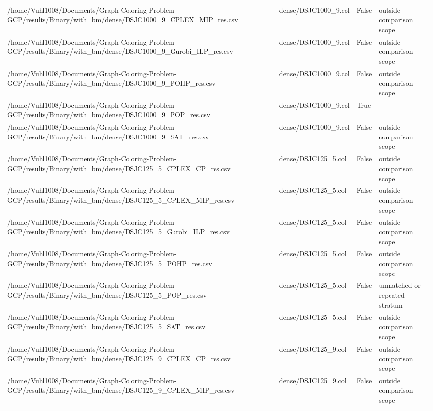\begin{table}[htbp]
\begin{tabular}{llll}
/home/Vuhl1008/Documents/Graph-Coloring-Problem-GCP/results/Binary/with\_bm/dense/DSJC1000\_9\_CPLEX\_MIP\_res.csv & dense/DSJC1000\_9.col & False & outside comparison scope \\
/home/Vuhl1008/Documents/Graph-Coloring-Problem-GCP/results/Binary/with\_bm/dense/DSJC1000\_9\_Gurobi\_ILP\_res.csv & dense/DSJC1000\_9.col & False & outside comparison scope \\
/home/Vuhl1008/Documents/Graph-Coloring-Problem-GCP/results/Binary/with\_bm/dense/DSJC1000\_9\_POHP\_res.csv & dense/DSJC1000\_9.col & False & outside comparison scope \\
/home/Vuhl1008/Documents/Graph-Coloring-Problem-GCP/results/Binary/with\_bm/dense/DSJC1000\_9\_POP\_res.csv & dense/DSJC1000\_9.col & True & -- \\
/home/Vuhl1008/Documents/Graph-Coloring-Problem-GCP/results/Binary/with\_bm/dense/DSJC1000\_9\_SAT\_res.csv & dense/DSJC1000\_9.col & False & outside comparison scope \\
/home/Vuhl1008/Documents/Graph-Coloring-Problem-GCP/results/Binary/with\_bm/dense/DSJC125\_5\_CPLEX\_CP\_res.csv & dense/DSJC125\_5.col & False & outside comparison scope \\
/home/Vuhl1008/Documents/Graph-Coloring-Problem-GCP/results/Binary/with\_bm/dense/DSJC125\_5\_CPLEX\_MIP\_res.csv & dense/DSJC125\_5.col & False & outside comparison scope \\
/home/Vuhl1008/Documents/Graph-Coloring-Problem-GCP/results/Binary/with\_bm/dense/DSJC125\_5\_Gurobi\_ILP\_res.csv & dense/DSJC125\_5.col & False & outside comparison scope \\
/home/Vuhl1008/Documents/Graph-Coloring-Problem-GCP/results/Binary/with\_bm/dense/DSJC125\_5\_POHP\_res.csv & dense/DSJC125\_5.col & False & outside comparison scope \\
/home/Vuhl1008/Documents/Graph-Coloring-Problem-GCP/results/Binary/with\_bm/dense/DSJC125\_5\_POP\_res.csv & dense/DSJC125\_5.col & False & unmatched or repeated stratum \\
/home/Vuhl1008/Documents/Graph-Coloring-Problem-GCP/results/Binary/with\_bm/dense/DSJC125\_5\_SAT\_res.csv & dense/DSJC125\_5.col & False & outside comparison scope \\
/home/Vuhl1008/Documents/Graph-Coloring-Problem-GCP/results/Binary/with\_bm/dense/DSJC125\_9\_CPLEX\_CP\_res.csv & dense/DSJC125\_9.col & False & outside comparison scope \\
/home/Vuhl1008/Documents/Graph-Coloring-Problem-GCP/results/Binary/with\_bm/dense/DSJC125\_9\_CPLEX\_MIP\_res.csv & dense/DSJC125\_9.col & False & outside comparison scope \\

\end{tabular}
\end{table}
